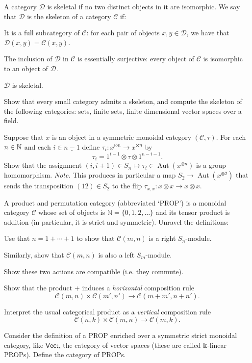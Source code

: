 \begin{question}\label{ex:skeleton}
A category $\mathcal D$ is skeletal if no two distinct
objects in it are isomorphic. We say that $\mathcal{D}$ is
the skeleton of a category $\mathcal{C}$ if:
\begin{tenumerate}
\item It is a full subcategory of $\mathcal{C}$: for each
pair of objects $x,y\in\mathcal{D}$, we have that $\mathcal{D}(x,y) = \mathcal{C}(x,y)$.
\item The inclusion of $\mathcal{D}$ in $\mathcal{C}$ is
essentially surjective: every object of $\mathcal{C}$ is
isomorphic to an object of $\mathcal{D}$.
\item $\mathcal{D}$ is skeletal.
\end{tenumerate}
Show that every small category admits a skeleton, and
compute the skeleton of the following categories: sets,
finite sets, finite dimensional vector spaces over
a field.
\end{question}
\medskip

\begin{question}
Suppose that $x$ is an object in a symmetric monoidal
category $(\mathcal{C},\tau)$. For each $n\in\mathbb N$ and 
each $i\in \underline{n-1}$ define $\tau_i : x^{\otimes n} 
\longrightarrow x^{\otimes n}$ by
\[ \tau_i = 1^{i-1} \otimes \tau \otimes 1^{n-i-1}.\]
Show that the assignment
$(i,i+1)\in S_n\longmapsto \tau_i
	 \in\operatorname{Aut}( x^{\otimes n})$ 
	 is a group homomorphism. \emph{Note.} This
	 produces in particular a map $S_2\longrightarrow 
	 \operatorname{Aut}(x^{\otimes 2})$ that sends
	 the transposition $(12)\in S_2$ to the
	 flip $\tau_{x,x}:x\otimes x\longrightarrow 
	 x\otimes x$.  
\end{question}

\begin{question} A product and permutation category (abbreviated `PROP')
is a monoidal category $\mathcal{C}$ whose set of objects is $\mathbb N = 
\{0,1,2,\ldots\}$ and its tensor product is addition (in particular, it is strict and symmetric). Unravel the definitions:
\begin{tenumerate}
\item Use that $n = 1+\cdots + 1$ to show that $\mathcal{C}(m,n)$ is a right $S_n$-module.
\item Similarly, show that $\mathcal{C}(m,n)$ is also a left $S_m$-module.
\item Show these two actions are compatible (i.e. they commute).
\item Show that the product $+$ induces a \emph{horizontal} composition rule 
\[ \mathcal{C}(m,n) \times \mathcal{C}(m',n') 	\longrightarrow
 	\mathcal{C}(m+m',n+n'). \]
\item Interpret the usual categorical product as a \emph{vertical} composition rule 
\[ \mathcal{C}(n,k) \times \mathcal{C}(m,n) 	\longrightarrow
 	\mathcal{C}(m,k). \]
\end{tenumerate}
Consider the definition of a PROP enriched over a symmetric strict 
monoidal category, like $\mathsf{Vect}$, the category of vector spaces (these are called $\Bbbk$-linear
PROPs). Define the category of PROPs. 
\end{question}

